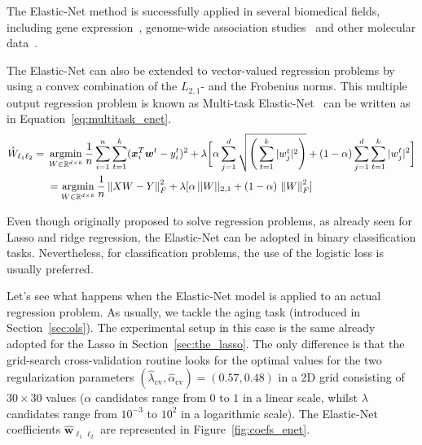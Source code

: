			The Elastic-Net method is successfully applied in several biomedical fields, including gene expression~\cite{jacob2015robust, de2009regularized}, genome-wide association studies~\cite{waldmann2013evaluation} and other molecular data~\cite{aben2016tandem, jacob2015robust}.


			The Elastic-Net can also be extended to vector-valued regression problems by using a convex combination of the $L_{2,1}$- and the Frobenius norms. This multiple output regression problem is known as Multi-task Elastic-Net~\cite{chen2012adaptive} can be written as in Equation~\eqref{eq:multitask_enet}.
			\begin{equation} \label{eq:multitask_enet}
				\begin{aligned}
					\hat W_{\ell_1\ell_2}={} & \mathop{\mathrm{argmin}}\limits_{W \in \mathbb{R}^{d \times k}} \frac{1}{n} \sum_{i=1}^n \sum_{t=1}^k (\bm{x}_i^T\bm{w}^t - y_i^t)^2 + \lambda \bigg[ \alpha \sum_{j=1}^d \sqrt{\Bigg(\sum_{t=1}^k |w_j^t|^2\Bigg)} + (1-\alpha)  \sum_{j=1}^d \sum_{t=1}^k |w_j^t|^2 \bigg] \\
					& =	\mathop{\mathrm{argmin}}\limits_{W \in \mathbb{R}^{d \times k}} \frac{1}{n} \left\lVert XW - Y\right\rVert_F^2 + \lambda [\alpha\,||W||_{2,1} + (1-\alpha)\,\left\lVert W\right\rVert_F^2]
				\end{aligned}
   		\end{equation}

			Even though originally proposed to solve regression problems, as already seen for Lasso and ridge regression, the Elastic-Net can be adopted in binary classification tasks. Nevertheless, for classification problems, the use of the logistic loss is usually preferred.

			Let's see what happens when the Elastic-Net model is applied to an actual regression problem. As usually, we tackle the aging task (introduced in Section~\ref{sec:ols}).
			The experimental setup in this case is the same already adopted for the Lasso in Section~\ref{sec:the_lasso}. The only difference is that the grid-search cross-validation routine looks for the optimal values for the two regularization parameters $(\hat \lambda_{\text{cv}}, \hat \alpha_{\text{cv}}) = (0.57, 0.48)$ in a 2D grid consisting of $30 \times 30$ values ($\alpha$ candidates range from $0$ to $1$ in a linear scale, whilst $\lambda$ candidates range from $10^{-3}$ to $10^{2}$ in a logarithmic scale). The Elastic-Net coefficients $\bm{\hat w}_{\ell_1\ell_2}$ are represented in Figure~\ref{fig:coefs_enet}.

